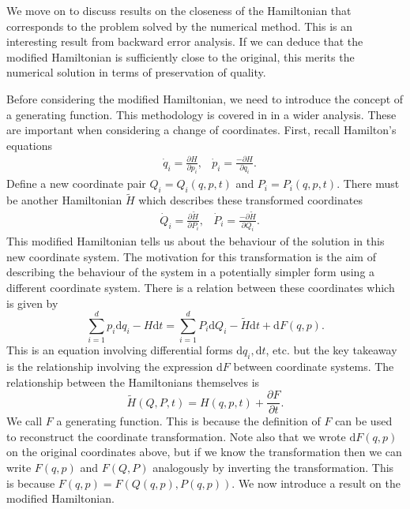 \documentclass{report}
\theoremstyle{exampstyle} \newtheorem{example}[theorem]{Example}
\theoremstyle{exampstyle} \newtheorem{remark}[theorem]{Remark}
\theoremstyle{exampstyle} \newtheorem{definition}[theorem]{Definition}
\theoremstyle{exampstyle} \newtheorem{lemma}[theorem]{Lemma}
\theoremstyle{exampstyle} \newtheorem{proposition}[theorem]{Proposition}
\begin{document}
We move on to discuss results on the closeness of the Hamiltonian that corresponds to the problem solved by the numerical method.
This is an interesting result from backward error analysis.
If we can deduce that the modified Hamiltonian is sufficiently close to the original,
this merits the numerical solution in terms of preservation of quality.

Before considering the modified Hamiltonian, we need to introduce the concept of a generating function.
This methodology is covered in \cite{Casas_2016} in a wider analysis.
These are important when considering a change of coordinates.
First, recall Hamilton's equations
\begin{align*}
	&\dot{q}_i = \frac{\partial H}{\partial p_i}, &\dot{p}_i = \frac{- \partial H}{\partial q_i}.
\end{align*}
Define a new coordinate pair $Q_i = Q_i(q,p,t)$ and $P_i = P_i(q,p,t)$.
There must be another Hamiltonian $\tilde{H}$ which describes these transformed coordinates
\begin{align*}
	&\dot{Q}_i = \frac{\partial \tilde{H}}{\partial P_i}, &\dot{P}_i = \frac{- \partial \tilde{H}}{\partial Q_i}.
\end{align*}
This modified Hamiltonian tells us about the behaviour of the solution in this new coordinate system.
The motivation for this transformation is the aim of describing the behaviour of the system in a potentially simpler form using a different coordinate system. %
There is a relation between these coordinates which is given by
\begin{equation*}
	\sum_{i=1}^{d} p_i \mathrm{d}q_i - H \mathrm{d}t = \sum_{i=1}^{d} P_i \mathrm{d}Q_i - \tilde{H} \mathrm{d}t + \mathrm{d}F(q,p).
\end{equation*}
This is an equation involving differential forms $\mathrm{d}q_i, \mathrm{d}t$, etc. but the key takeaway is the relationship involving the expression $\mathrm{d}F$ between coordinate systems.
The relationship between the Hamiltonians themselves is
\begin{equation*}
	\tilde{H}(Q,P,t) = H(q,p,t) + \frac{\partial F}{\partial t}.
\end{equation*}
We call $F$ a generating function. This is because the definition of $F$ can be used to reconstruct the coordinate transformation.
Note also that we wrote $\mathrm{d}F(q,p)$ on the original coordinates above, but if we know the transformation then we can write $F(q,p)$ and $F(Q,P)$ analogously by inverting the transformation.
This is because $F(q,p) = F(Q(q,p),P(q,p))$.
We now introduce a result on the modified Hamiltonian.
\end{document}
